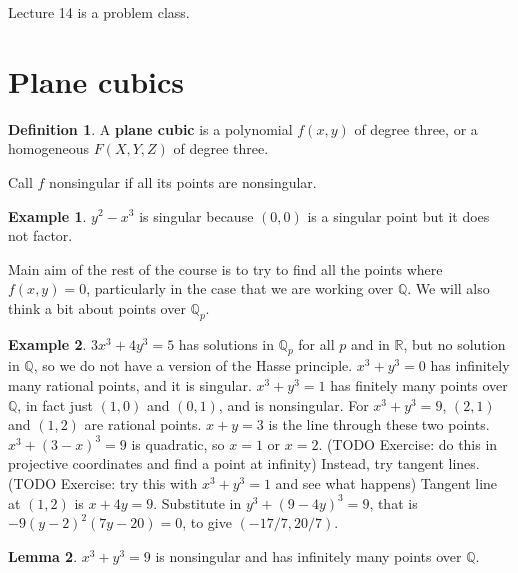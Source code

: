 \documentclass{article}
\newcommand{\Q}{\mathbb{Q}}
\newcommand{\R}{\mathbb{R}}
\newcommand{\rb}[1]{\left( #1 \right)}
\theoremstyle{definition}\newtheorem{definition}{Definition}[section]
\theoremstyle{definition}\newtheorem{remark}[definition]{Remark}
\theoremstyle{definition}\newtheorem*{example}{Example}
\theoremstyle{definition}\newtheorem*{note}{Note}
\newtheorem{lemma}[definition]{Lemma}
\begin{document}

Lecture 14 is a problem class.


\section{Plane cubics}

\begin{definition}
A \textbf{plane cubic} is a polynomial $ f\rb{x, y} $ of degree three, or a homogeneous $ F\rb{X, Y, Z} $ of degree three.
\end{definition}

Call $ f $ nonsingular if all its points are nonsingular.

\begin{example}
$ y^2 - x^3 $ is singular because $ \rb{0, 0} $ is a singular point but it does not factor.
\end{example}

Main aim of the rest of the course is to try to find all the points where $ f\rb{x, y} = 0 $, particularly in the case that we are working over $ \Q $. We will also think a bit about points over $ \Q_p $.

\begin{example}
$ 3x^3 + 4y^3 = 5 $ has solutions in $ \Q_p $ for all $ p $ and in $ \R $, but no solution in $ \Q $, so we do not have a version of the Hasse principle. $ x^3 + y^3 = 0 $ has infinitely many rational points, and it is singular. $ x^3 + y^3 = 1 $ has finitely many points over $ \Q $, in fact just $ \rb{1, 0} $ and $ \rb{0, 1} $, and is nonsingular. For $ x^3 + y^3 = 9 $, $ \rb{2, 1} $ and $ \rb{1, 2} $ are rational points. $ x + y = 3 $ is the line through these two points. $ x^3 + \rb{3 - x}^3 = 9 $ is quadratic, so $ x = 1 $ or $ x = 2 $. (TODO Exercise: do this in projective coordinates and find a point at infinity) Instead, try tangent lines. (TODO Exercise: try this with $ x^3 + y^3 = 1 $ and see what happens) Tangent line at $ \rb{1, 2} $ is $ x + 4y = 9 $. Substitute in $ y^3 + \rb{9 - 4y}^3 = 9 $, that is $ -9\rb{y - 2}^2\rb{7y - 20} = 0 $, to give $ \rb{-17 / 7, 20 / 7} $.
\end{example}

\begin{lemma}
$ x^3 + y^3 = 9 $ is nonsingular and has infinitely many points over $ \Q $.
\end{lemma}
\end{document}

